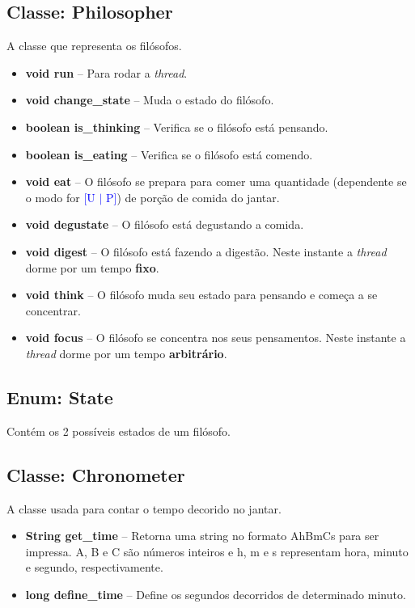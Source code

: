 \documentclass[11pt]{article}
\begin{document}
\subsection{Classe: Philosopher}
A classe que representa os filósofos. 
\begin{itemize}
	\item \textbf{\textcolor{sblue}{void} run} -- Para rodar a \textit{thread}.
	\item \textbf{\textcolor{sblue}{void} change\_state} -- Muda o estado do filósofo.
	\item \textbf{\textcolor{sblue}{boolean} is\_thinking} -- Verifica se o filósofo está pensando.
	\item \textbf{\textcolor{sblue}{boolean} is\_eating} -- Verifica se o filósofo está comendo.
	\item \textbf{\textcolor{sblue}{void} eat} -- O filósofo se prepara para comer uma quantidade (dependente se o modo for \textcolor{blue}{[U $|$ P]}) de porção de comida do jantar.
	\item \textbf{\textcolor{sblue}{void} degustate} -- O filósofo está degustando a comida.
	\item \textbf{\textcolor{sblue}{void} digest} -- O filósofo está fazendo a digestão. Neste instante a \textit{thread} dorme por um tempo \textbf{fixo}.
	\item \textbf{\textcolor{sblue}{void} think} -- O filósofo muda seu estado para pensando e começa a se concentrar.
	\item \textbf{\textcolor{sblue}{void} focus} -- O filósofo se concentra nos seus pensamentos. Neste instante a \textit{thread} dorme por um tempo \textbf{arbitrário}.
\end{itemize}

\subsection{Enum: State}
Contém os 2 possíveis estados de um filósofo.

\subsection{Classe: Chronometer}
A classe usada para contar o tempo decorido no jantar. 
\begin{itemize}
	\item \textbf{\textcolor{sblue}{String} get\_time} -- Retorna uma string no formato AhBmCs para ser impressa. A, B e C são números inteiros e h, m e s representam hora, minuto e segundo, respectivamente.
	\item \textbf{\textcolor{sblue}{long} define\_time} -- Define os segundos decorridos de determinado minuto.
\end{itemize}
\end{document}
